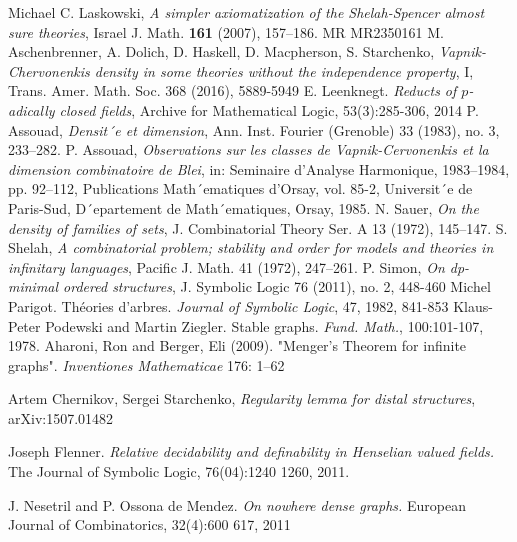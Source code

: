 \documentclass{report}
\begin{document}
%

 
\tableofcontents{}







\begin{thebibliography}{9}
  
  Michael C. Laskowski, \textit{A simpler axiomatization of the Shelah-Spencer almost sure theories},
  Israel J. Math. \textbf{161} (2007), 157–186. MR MR2350161	
  M. Aschenbrenner, A. Dolich, D. Haskell, D. Macpherson, S. Starchenko,
  \textit{Vapnik-Chervonenkis density in some theories without the independence property}, I,
  Trans. Amer. Math. Soc. 368 (2016), 5889-5949
  E. Leenknegt. \textit{Reducts of $p$-adically closed fields}, Archive for Mathematical Logic, 53(3):285-306, 2014
  P. Assouad, \textit{Densit´e et dimension}, Ann. Inst. Fourier (Grenoble) 33 (1983), no. 3, 233–282.
  P. Assouad, \textit{Observations sur les classes de Vapnik-Cervonenkis et la dimension combinatoire de Blei},
  in: Seminaire d’Analyse Harmonique, 1983–1984, pp. 92–112, Publications Math´ematiques
  d’Orsay, vol. 85-2, Universit´e de Paris-Sud, D´epartement de Math´ematiques, Orsay, 1985.
  N. Sauer, \textit{On the density of families of sets}, J. Combinatorial Theory Ser. A 13 (1972), 145–147.
  S. Shelah, \textit{A combinatorial problem; stability and order for models and theories in infinitary languages},
  Pacific J. Math. 41 (1972), 247–261.
  P. Simon,
  \textit{On dp-minimal ordered structures},
  J. Symbolic Logic 76 (2011), no. 2, 448-460
  Michel Parigot.
  Th\'eories d'arbres.
  \textit{Journal of Symbolic Logic}, 47, 1982, 841-853
	Klaus-Peter Podewski and Martin Ziegler. Stable graphs. \textit{Fund. Math.}, 100:101-107, 1978.
	Aharoni, Ron and Berger, Eli (2009). "Menger's Theorem for infinite graphs". \textit{Inventiones Mathematicae} 176: 1–62

Artem Chernikov, Sergei Starchenko, \textit{Regularity lemma for distal structures}, 	arXiv:1507.01482

Joseph Flenner. \textit{Relative decidability and definability in Henselian valued fields.} The
Journal of Symbolic Logic, 76(04):1240 1260, 2011.
	

J. Nesetril and P. Ossona de Mendez. \textit{On nowhere dense graphs.} European Journal of
Combinatorics, 32(4):600 617, 2011
  
\end{thebibliography}
\end{document}

